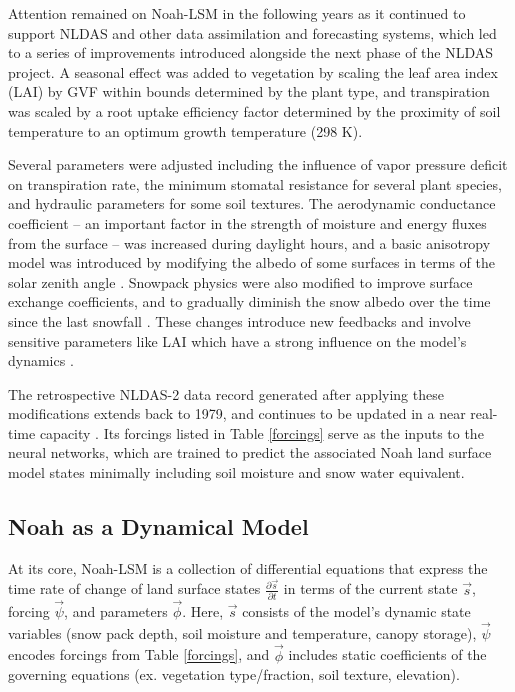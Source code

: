 \documentclass[11pt]{article}
\begin{document}
\begin{multicols}{2}

    Attention remained on Noah-LSM in the following years as it continued to support NLDAS and other data assimilation and forecasting systems, which led to a series of improvements introduced alongside the next phase of the NLDAS project. A seasonal effect was added to vegetation by scaling the leaf area index (LAI) by GVF within bounds determined by the plant type, and transpiration was scaled by a root uptake efficiency factor determined by the proximity of soil temperature to an optimum growth temperature (298 K).

    Several parameters were adjusted including the influence of vapor pressure deficit on transpiration rate, the minimum stomatal resistance for several plant species, and hydraulic parameters for some soil textures. The aerodynamic conductance coefficient -- an important factor in the strength of moisture and energy fluxes from the surface -- was increased during daylight hours, and a basic anisotropy model was introduced by modifying the albedo of some surfaces in terms of the solar zenith angle \cite{wei_improvement_2011}. Snowpack physics were also modified to improve surface exchange coefficients, and to gradually diminish the snow albedo over the time since the last snowfall \cite{livneh_noah_2010}\cite{liang_simple_1994}. These changes introduce new feedbacks and involve sensitive parameters like LAI which have a strong influence on the model's dynamics \cite{rosero_quantifying_2010}.

    The retrospective NLDAS-2 data record generated after applying these modifications extends back to 1979, and continues to be updated in a near real-time capacity \cite{xia_continental-scale_2012}. Its forcings listed in Table \ref{forcings} serve as the inputs to the neural networks, which are trained to predict the associated Noah land surface model states minimally including soil moisture and snow water equivalent.


    \subsection{Noah as a Dynamical Model}

    At its core, Noah-LSM is a collection of differential equations that express the time rate of change of land surface states $\frac{\partial \vec{s}}{\partial t}$ in terms of the current state $\vec{s}$, forcing $\vec{\psi}$, and parameters $\vec{\phi}$. Here, $\vec{s}$ consists of the model's dynamic state variables (snow pack depth, soil moisture and temperature, canopy storage), $\vec{\psi}$ encodes forcings from Table \ref{forcings}, and $\vec{\phi}$ includes static coefficients of the governing equations (ex. vegetation type/fraction, soil texture, elevation).


\end{multicols}
\end{document}
